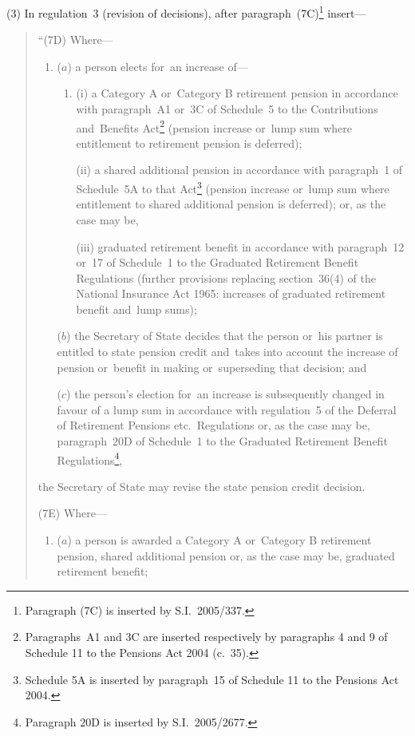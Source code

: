 \documentclass[12pt,a4paper]{article}
\begin{document}
(3) In regulation~3 (revision of decisions), after paragraph~(7C)\footnote{Paragraph (7C) is inserted by S.I.~2005/337.} insert—
\begin{quotation}
“(7D) Where—
\begin{enumerate}\item[]
($a$) a person elects for~an increase of—
\begin{enumerate}\item[]
(i) a Category A or~Category B retirement pension in accordance with paragraph~A1 or~3C of Schedule~5 to the Contributions and~Benefits Act\footnote{Paragraphs~A1 and 3C are inserted respectively by paragraphs 4 and 9 of Schedule 11 to the Pensions Act 2004 (c.~35).} (pension increase or~lump sum where entitlement to retirement pension is deferred);

(ii) a shared additional pension in accordance with paragraph~1 of Schedule~5A to that Act\footnote{Schedule 5A is inserted by paragraph~15 of Schedule 11 to the Pensions Act 2004.} (pension increase or~lump sum where entitlement to shared additional pension is deferred); or, as the case may be,

(iii) graduated retirement benefit in accordance with paragraph~12 or~17 of Schedule~1 to the Graduated Retirement Benefit Regulations (further provisions replacing section~36(4) of the National Insurance Act 1965: increases of graduated retirement benefit and~lump sums);\end{enumerate}

($b$) the Secretary of State decides that the person or~his partner is entitled to state pension credit and~takes into account the increase of pension or~benefit in making or~superseding that decision; and

($c$) the person’s election for~an increase is subsequently changed in favour of a lump sum in accordance with regulation~5 of the Deferral of Retirement Pensions etc.\ Regulations or, as the case may be, paragraph~20D of Schedule~1 to the Graduated Retirement Benefit Regulations\footnote{Paragraph 20D is inserted by S.I.~2005/2677.},
\end{enumerate}
the Secretary of State may revise the state pension credit decision.

(7E) Where—
\begin{enumerate}\item[]
($a$) a person is awarded a Category A or~Category B retirement pension, shared additional pension or, as the case may be, graduated retirement benefit;


\end{enumerate}
\end{quotation}
\end{document}
